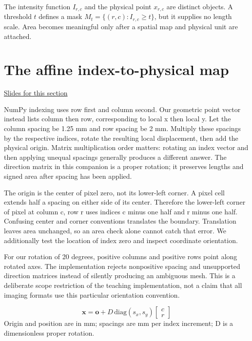 \documentclass[11pt,letterpaper]{article}
\theoremstyle{definition}\newtheorem{definition}{Definition}\newtheorem{example}{Example}
\numberwithin{equation}{section}
\begin{document}
The intensity function $I_{r,c}$ and the physical point $x_{r,c}$ are distinct objects. A threshold $t$ defines a mask $M_t=\{(r,c):I_{r,c}\ge t\}$, but it supplies no length scale. Area becomes meaningful only after a spatial map and physical unit are attached.
\section{The affine index-to-physical map}
\hypertarget{note-the-affine-index-to-physical-map}{}\label{note:the-affine-index-to-physical-map}
{\small \href{slides.html\#frame=the-physical-coordinate-map\&step=1}{Slides for this section}}\par
NumPy indexing uses row first and column second. Our geometric point vector instead lists column then row, corresponding to local x then local y. Let the column spacing be 1.25 mm and row spacing be 2 mm. Multiply these spacings by the respective indices, rotate the resulting local displacement, then add the physical origin. Matrix multiplication order matters: rotating an index vector and then applying unequal spacings generally produces a different answer. The direction matrix in this companion is a proper rotation; it preserves lengths and signed area after spacing has been applied.

The origin is the center of pixel zero, not its lower-left corner. A pixel cell extends half a spacing on either side of its center. Therefore the lower-left corner of pixel at column c, row r uses indices c minus one half and r minus one half. Confusing center and corner conventions translates the boundary. Translation leaves area unchanged, so an area check alone cannot catch that error. We additionally test the location of index zero and inspect coordinate orientation.

For our rotation of 20 degrees, positive columns and positive rows point along rotated axes. The implementation rejects nonpositive spacing and unsupported direction matrices instead of silently producing an ambiguous mesh. This is a deliberate scope restriction of the teaching implementation, not a claim that all imaging formats use this particular orientation convention.

\[
\mathbf{x}=\mathbf{o}+D\,\mathrm{diag}(s_x,s_y)\begin{bmatrix}c\\r\end{bmatrix}
\]
Origin and position are in mm; spacings are mm per index increment; D is a dimensionless proper rotation.
\end{document}
